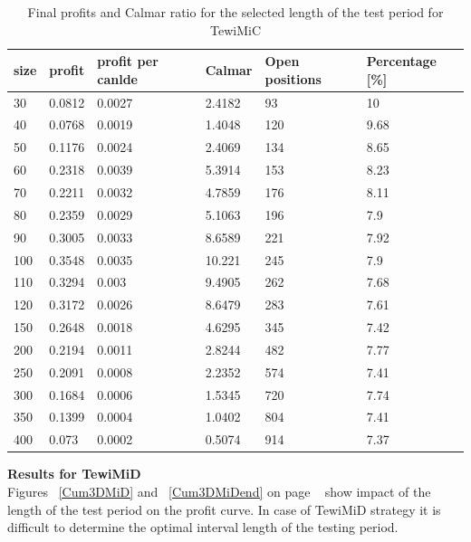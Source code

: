 \documentclass{tewiart}
\begin{document}
\begin{table}[h!] 
\caption{Final profits and Calmar ratio for the selected length of the test period for TewiMiC}
\tiny
\label{table1}
\begin{center}
\begin{tabular}{|l|l|l|l|l|l|} 
 \hline size & profit & profit per canlde & Calmar & Open positions & Percentage [\%]\\ \hline  
 30 & 0.0812 & 0.0027 & 2.4182 & 93 & 10 \\ 
 40 & 0.0768 & 0.0019 & 1.4048 & 120 & 9.68 \\ 
 50 & 0.1176 & 0.0024 & 2.4069 & 134 & 8.65 \\ 
 60 & 0.2318 & 0.0039 & 5.3914 & 153 & 8.23 \\ 
 70 & 0.2211 & 0.0032 & 4.7859 & 176 & 8.11 \\ 
 80 & 0.2359 & 0.0029 & 5.1063 & 196 & 7.9 \\ 
 90 & 0.3005 & 0.0033 & 8.6589 & 221 & 7.92 \\ 
 100 & 0.3548 & 0.0035 & 10.221 & 245 & 7.9 \\ 
 110 & 0.3294 & 0.003 & 9.4905 & 262 & 7.68 \\ 
 120 & 0.3172 & 0.0026 & 8.6479 & 283 & 7.61 \\ 
 150 & 0.2648 & 0.0018 & 4.6295 & 345 & 7.42 \\ 
 200 & 0.2194 & 0.0011 & 2.8244 & 482 & 7.77 \\ 
 250 & 0.2091 & 0.0008 & 2.2352 & 574 & 7.41 \\ 
 300 & 0.1684 & 0.0006 & 1.5345 & 720 & 7.74 \\ 
 350 & 0.1399 & 0.0004 & 1.0402 & 804 & 7.41 \\ 
400 & 0.073 & 0.0002 & 0.5074 & 914 & 7.37 \\ 
 \hline \end{tabular} 
\end{center}
 \end{table}
 \FloatBarrier


\textbf{Results for TewiMiD }\\
Figures ~\ref{Cum3DMiD} and ~\ref{Cum3DMiDend} on page ~\pageref{Cum3DMiDend} show impact of the length of the test period on the profit curve. In case of TewiMiD strategy it is difficult to determine the optimal interval length of the testing period.
\end{document}
